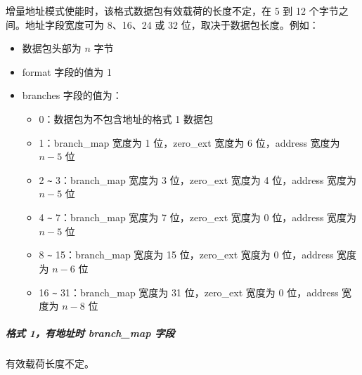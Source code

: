 \documentclass[main\_\_CN.tex]{subfiles}
\begin{document}
增量地址模式使能时，该格式数据包有效载荷的长度不定，在 5 到 12 个字节之间。地址字段宽度可为 8、16、24 或 32 位，取决于数据包长度。例如：
\begin{itemize}
    \item 数据包头部为 $n$ 字节
    \item format 字段的值为 1
    \item branches 字段的值为：
        \begin{itemize}
            \item 0：数据包为不包含地址的格式 1 数据包
            \item 1：branch\_map 宽度为 1 位，zero\_ext 宽度为 6 位，address 宽度为 $n-5$ 位
            \item 2 \verb+~+ 3：branch\_map 宽度为 3 位，zero\_ext 宽度为 4 位，address 宽度为 $n-5$ 位
            \item 4 \verb+~+ 7：branch\_map 宽度为 7 位，zero\_ext 宽度为 0 位，address 宽度为 $n-5$ 位
            \item 8 \verb+~+ 15：branch\_map 宽度为 15 位，zero\_ext 宽度为 0 位，address 宽度为 $n-6$ 位
            \item 16 \verb+~+ 31：branch\_map 宽度为 31 位，zero\_ext 宽度为 0 位，address 宽度为 $n-8$ 位
        \end{itemize}
\end{itemize}


\subparagraph{格式 1，有地址时 branch\_map 字段}


有效载荷长度不定。
\end{document}
